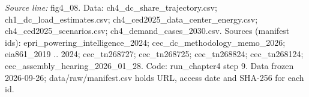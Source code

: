 {\scriptsize\textit{Source line:} fig4\_\allowbreak{}08. Data: ch4\_\allowbreak{}dc\_\allowbreak{}share\_\allowbreak{}trajectory.csv; ch1\_\allowbreak{}dc\_\allowbreak{}load\_\allowbreak{}estimates.csv; ch4\_\allowbreak{}ced2025\_\allowbreak{}data\_\allowbreak{}center\_\allowbreak{}energy.csv; ch4\_\allowbreak{}ced2025\_\allowbreak{}scenarios.csv; ch4\_\allowbreak{}demand\_\allowbreak{}cases\_\allowbreak{}2030.csv. Sources (manifest ids): epri\_\allowbreak{}powering\_\allowbreak{}intelligence\_\allowbreak{}2024; cec\_\allowbreak{}dc\_\allowbreak{}methodology\_\allowbreak{}memo\_\allowbreak{}2026; eia861\_\allowbreak{}2019 .. 2024; cec\_\allowbreak{}tn268727; cec\_\allowbreak{}tn268725; cec\_\allowbreak{}tn268824; cec\_\allowbreak{}tn268124; cec\_\allowbreak{}assembly\_\allowbreak{}hearing\_\allowbreak{}2026\_\allowbreak{}01\_\allowbreak{}28. Code: run\_\allowbreak{}chapter4 step 9. Data frozen 2026-09-26; data/raw/manifest.csv holds URL, access date and SHA-256 for each id.}